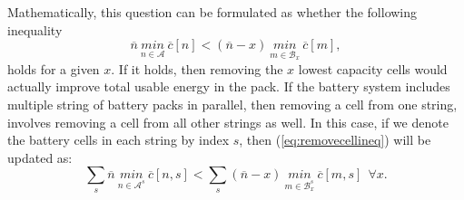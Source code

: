 \documentclass[10pt,twocolumn]{IEEEtran}
\begin{document}
Mathematically, this question can be formulated as whether the following inequality
%
\begin{equation}
\overline{n} \  \underset{n\in \mathcal{A}}{min} \ \overline c[n] < (\overline{n}-x) \ \underset{m\in \mathcal{B}_x}{min} \ \overline c[m],
\label{eq:removecellineq}
\end{equation}
%
holds for a given $x$.  If it  holds, then removing the $x$ lowest capacity cells would actually improve total usable energy in the pack. 
If the battery system includes multiple string of battery packs in parallel, then removing a cell from one string, involves removing a cell from all other strings as well.
In this case, if we denote the battery cells in each string by index $s$,  then (\ref{eq:removecellineq}) will be updated  as:
%
\begin{equation}
\sum_{s} \overline{n} \  \underset{n\in \mathcal{A}^s}{min} \ \overline c[n,s] <  \sum_{s}(\overline{n}-x) \ \underset{m\in \mathcal{B}^{s}_x}{min} \ \overline c[m,s] \ \  \forall x.
\label{eq:removecellineq2}
\end{equation}
%
%
\end{document}
